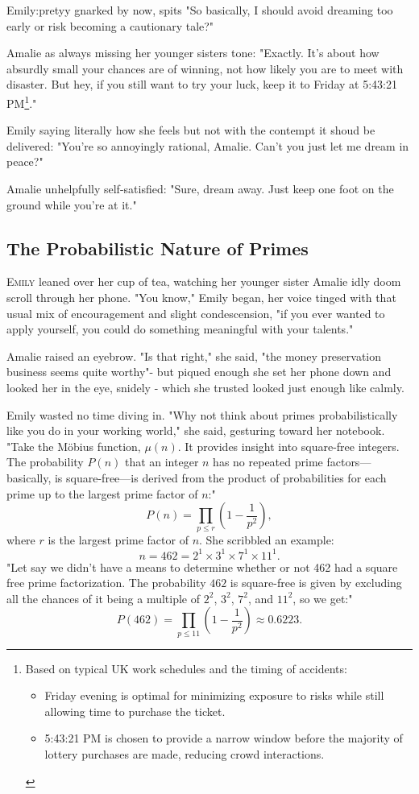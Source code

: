 \noindent
{Emily:pretyy gnarked by now, spits} "So basically, I should avoid dreaming too early or risk becoming a cautionary tale?"

\noindent
{Amalie as always missing her younger sisters tone:} "Exactly. It’s about how absurdly small your chances are of winning, not how likely you are to meet with disaster. But hey, if you still want to try your luck, keep it to Friday at 5:43:21 PM\footnote{Based on typical UK work schedules and the timing of accidents:
\begin{itemize}
    \item Friday evening is optimal for minimizing exposure to risks while still allowing time to purchase the ticket.
    \item 5:43:21 PM is chosen to provide a narrow window before the majority of lottery purchases are made, reducing crowd interactions.
\end{itemize}}."

\noindent
{Emily saying literally how she feels but not with the contempt it shoud be delivered:} "You’re so annoyingly rational, Amalie. Can’t you just let me dream in peace?"

\noindent
{Amalie unhelpfully self-satisfied:} "Sure, dream away. Just keep one foot on the ground while you’re at it."

\subsection*{The Probabilistic Nature of Primes}

\lettrine{E}{mily} leaned over her cup of tea, watching her younger sister Amalie idly doom scroll through her phone. "You know," Emily began, her voice tinged with that usual mix of encouragement and slight condescension, "if you ever wanted to apply yourself, you could do something meaningful with your talents."

Amalie raised an eyebrow. "Is that right," she said, "the money preservation business seems quite worthy"- but piqued enough she set her phone down and looked her in the eye, snidely - which she trusted looked just enough like calmly.


Emily wasted no time diving in. "Why not think about primes probabilistically like you do in your working world," she said, gesturing toward her notebook. "Take the Möbius function, \(\mu(n)\). It provides insight into square-free integers. The probability \(P(n)\) that an integer \(n\) has no repeated prime factors—basically, is square-free—is derived from the product of probabilities for each prime up to the largest prime factor of \(n\):"
\[
P(n) = \prod_{p \leq r} \left(1 - \frac{1}{p^2}\right),
\]
where \(r\) is the largest prime factor of \(n\). She scribbled an example:
\[
n = 462 = 2^1 \times 3^1 \times 7^1 \times 11^1.
\]
"Let say we didn't have a means to determine whether or not 462 had a square free prime factorization. The probability \(462\) is square-free is given by excluding all the chances of it being a multiple of \(2^2\), \(3^2\), \(7^2\), and \(11^2\), so we get:"
\[
P(462) = \prod_{p \leq 11} \left(1 - \frac{1}{p^2}\right) \approx 0.6223.
\]

